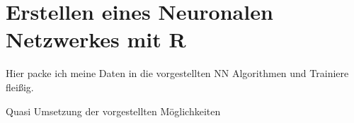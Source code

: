 \section{Erstellen eines Neuronalen Netzwerkes mit R}
\label{sec:NNExperiment}
Hier packe ich meine Daten in die vorgestellten NN Algorithmen und Trainiere fleißig. 

Quasi Umsetzung der vorgestellten Möglichkeiten